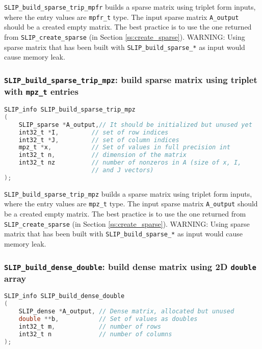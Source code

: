 \documentclass[11pt]{article}
\theoremstyle{definition}
\begin{document}
\verb|SLIP_build_sparse_trip_mpfr| builds a sparse matrix using triplet form inputs, where the entry values are \verb|mpfr_t| type. The input sparse matrix \verb|A_output| should be a created empty matrix. The best practice is to use the one returned from \verb|SLIP_create_sparse| (in Section \ref{ss:create_sparse}). WARNING: Using sparse matrix that has been built with \verb|SLIP_build_sparse_*| as input would cause memory leak.


\cprotect\subsubsection{\verb|SLIP_build_sparse_trip_mpz|: build sparse matrix using triplet with \verb|mpz_t| entries}\label{s:user:build_sparse_trip_mpz}
\begin{lstlisting}[language=C,frame=single]
SLIP_info SLIP_build_sparse_trip_mpz
(
    SLIP_sparse *A_output,// It should be initialized but unused yet
    int32_t *I,         // set of row indices
    int32_t *J,         // set of column indices
    mpz_t *x,           // Set of values in full precision int
    int32_t n,          // dimension of the matrix
    int32_t nz          // number of nonzeros in A (size of x, I,
                        // and J vectors)
);
\end{lstlisting}

\verb|SLIP_build_sparse_trip_mpz| builds a sparse matrix using triplet form inputs, where the entry values are \verb|mpz_t| type. The input sparse matrix \verb|A_output| should be a created empty matrix. The best practice is to use the one returned from \verb|SLIP_create_sparse| (in Section \ref{ss:create_sparse}). WARNING: Using sparse matrix that has been built with \verb|SLIP_build_sparse_*| as input would cause memory leak.

\cprotect\subsubsection{\verb|SLIP_build_dense_double|: build dense matrix using 2D \verb|double| array}\label{s:user:build_dense_double}
\begin{lstlisting}[language=C,frame=single]
SLIP_info SLIP_build_dense_double
(
    SLIP_dense *A_output, // Dense matrix, allocated but unused
    double **b,           // Set of values as doubles
    int32_t m,            // number of rows
    int32_t n             // number of columns
);
\end{lstlisting}
\end{document}
